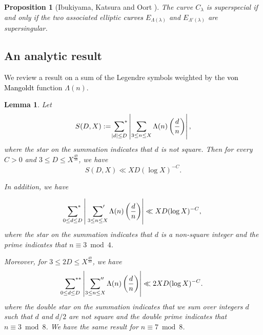 \documentclass[a4paper, 11pt]{article}
\theoremstyle{plain}
\newtheorem{prop}[defn]{Proposition}
\newtheorem{lem}[defn]{Lemma}
\newcommand{\?}{\textcolor{red}{??}}
\newcommand{\lm}{\lambda}
\begin{document}
    
\begin{prop}[Ibukiyama, Katsura and Oort {\cite[Lemma 1.1 (),\ Proposition 1.3 (), ()]{IKO02}}]
\label{arigataya}
The curve $C_{\lm}$ is superspecial if and only if the two associated elliptic \textcolor{black}{curves} $E_{\Lambda(\lm)}$ and $ E_{{\Lambda}'(\lm)}$ are supersingular. 
\end{prop}

\subsection{An analytic result}
We review a result on a sum of the Legendre symbols weighted by the \textcolor{black}{von Mangoldt} function $\Lambda(n)$.

\begin{lem}
\label{jutila}
Let 
\[
S(D,X):=\sideset{}{^*} \sum_{|d| \le D} \left| \sum_{3 \le n \le X} \Lambda(n) \left( \frac{d}{n}\right) \right|,
\]
where the star on the summation indicates that $d$ is not square. Then for every $C>0$ and $3 \le D \le X^{\frac{49}{50}}$, we have 
\[
S(D,X) \ll XD(\log X)^{-C}.
\]

In addition, we have

\[
\sideset{}{^*} \sum_{0\le d \le D} \left| \  \sideset{}{'} \sum_{3 \le n \le X} \Lambda(n) \left( \frac{d}{n}\right) \right| \ll XD(\log X)^{-C},
\]
where the star on the summation indicates that $d$ is a non\textcolor{black}{-}square integer and the prime indicates that $n \equiv 3 \bmod 4$.

Moreover, for $3 \le 2D \le X^{\frac{49}{50}}$, we have
\[
\sideset{}{^{**}}\sum_{0\le d \le D} \left| \ \sideset{}{''} \sum_{3 \le n \le X} \Lambda(n) \left( \frac{d}{n}\right) \right| \ll  2XD(\log X)^{-C}.
\]
where the double star on the summation indicates that we sum over integers $d$ such that $d$ and $d/2$ are not square and the double prime indicates that $n \equiv 3 \bmod 8$. We have the same result for $n \equiv 7 \bmod 8$.
\end{lem}
\end{document}
